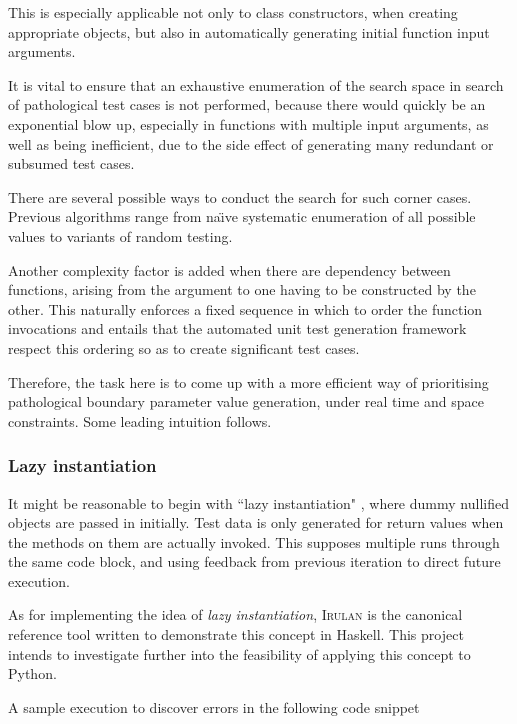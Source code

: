 \documentclass{icldt}
\numberwithin{equation}{section}       %
\def\naive{na\"{\i}ve }
\begin{document}
{This is especially applicable not only to class constructors, when creating appropriate objects, but also in automatically generating initial function input arguments.

It is vital to ensure that an exhaustive enumeration of the search space in search of 
pathological test cases is not performed, because there would quickly be an exponential blow up, especially in functions with multiple input arguments, as well as being inefficient, due to the side effect of generating many redundant or subsumed test cases.

There are several possible ways to conduct the search for such corner cases. Previous algorithms range from \naive systematic enumeration of all possible values to variants of random testing.

Another complexity factor is added when there are dependency between functions, arising from the argument to one having to be constructed by the other. This naturally enforces a fixed sequence in which to order the function invocations and entails that the automated unit test generation framework respect this ordering so as to create significant test cases.

Therefore, the task here is to come up with a more efficient way of prioritising pathological boundary parameter value generation, under real time and space constraints. Some leading intuition follows.
\subsubsection{Lazy instantiation}
It might be reasonable to begin with ``lazy instantiation" \cite{Allwood2011}, where dummy \textsf{null}ified objects are passed in initially. Test data is only generated for return values when the methods on them are actually invoked. This supposes multiple runs through the same code block, and using feedback from previous iteration to direct future execution.

As for implementing the idea of \emph{lazy instantiation}, \textsc{Irulan} \cite{Allwood2011} is the canonical reference tool written to demonstrate this concept in Haskell. This project intends to investigate further into the feasibility of applying this concept to Python.

A sample execution to discover errors in the following code snippet

}
\end{document}
